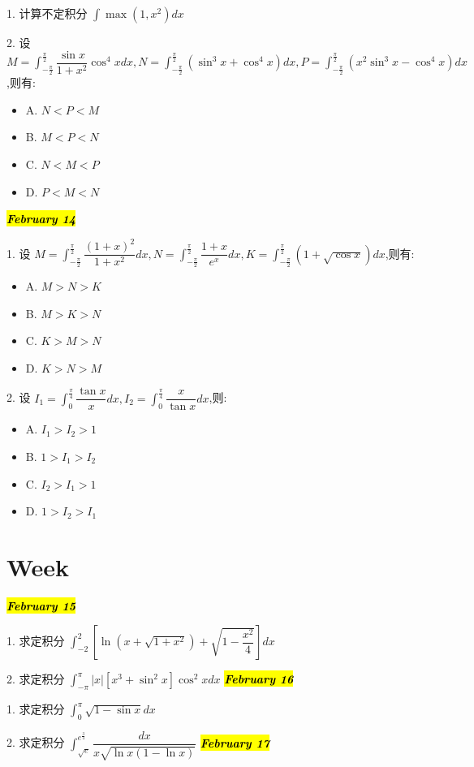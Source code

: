 1. 计算不定积分 $\int \max(1,x^{2})dx$

2. 设 $M=\int_{-\frac{\pi}{2}}^{\frac{\pi}{2}}\dfrac{\sin x}{1+x^{2}}\cos^{4}xdx,N=\int_{-\frac{\pi}{2}}^{\frac{\pi}{2}}(\sin^{3}x+\cos^{4}x)dx,P=\int_{-\frac{\pi}{2}}^{\frac{\pi}{2}}(x^{2}\sin^{3}x-\cos^{4}x)dx$,则有: 
\begin{itemize}
	\item A. $N<P<M$
	\item B. $M<P<N$
	\item C. $N<M<P$
	\item D. $P<M<N$
\end{itemize}
\hl{\textbf{\textit{February 14}}}

1. 设 $M=\int_{-\frac{\pi}{2}}^{\frac{\pi}{2}}\dfrac{(1+x)^{2}}{1+x^{2}}dx,N=\int_{-\frac{\pi}{2}}^{\frac{\pi}{2}}\dfrac{1+x}{e^{x}}dx,K=\int_{-\frac{\pi}{2}}^{\frac{\pi}{2}}(1+\sqrt{\cos x})dx$,则有: 
\begin{itemize}
	\item A. $M>N>K$
	\item B. $M>K>N$
	\item C. $K>M>N$
	\item D. $K>N>M$
\end{itemize}

2. 设 $I_{1}=\int_{0}^{\frac{\pi}{4}}\dfrac{\tan x}{x}dx,I_{2}=\int_{0}^{\frac{\pi}{4}}\dfrac{x}{\tan x}dx$,则:
\begin{itemize}
	\item A. $I_{1}>I_{2}>1$
	\item B. $1>I_{1}>I_{2}$
	\item C. $I_{2}>I_{1}>1$
	\item D. $1>I_{2}>I_{1}$
\end{itemize}
\section{Week }
\hl{\textbf{\textit{February 15}}}

1. 求定积分 $\int_{-2}^{2}[\ln(x+\sqrt{1+x^{2}})+\sqrt{1-\dfrac{x^{2}}{4}}]dx$

2. 求定积分 $\int_{-\pi}^{\pi}|x|[x^{3}+\sin^{2}x]\cos^{2}xdx$
\hl{\textbf{\textit{February 16}}}

1. 求定积分 $\int_{0}^{\pi}\sqrt{1-\sin x}dx$

2. 求定积分 $\int_{\sqrt{e}}^{e^{\frac{3}{4}}}\dfrac{dx}{x\sqrt{\ln x(1-\ln x)}}$
\hl{\textbf{\textit{February 17}}}

